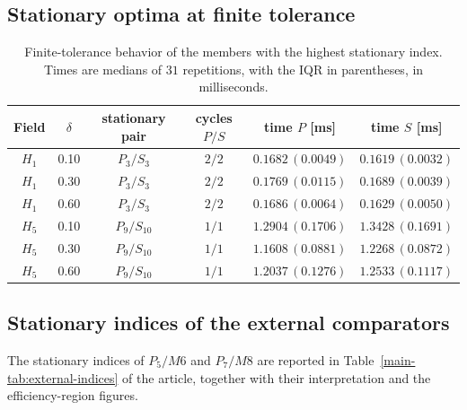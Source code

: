 \documentclass[11pt]{article}
\begin{document}
\subsection{Stationary optima at finite tolerance}
\begin{table}[htbp]
\centering
\scriptsize
\caption{Finite-tolerance behavior of the members with the highest stationary index. Times are medians of $31$ repetitions, with the IQR in parentheses, in milliseconds.}
\label{tab:asymptotic-members-finite}
\begin{tabular}{cccccc}
\toprule
Field & $\delta$ & stationary pair & cycles $P/S$ & time $P$ [ms] & time $S$ [ms]\\
\midrule
$H_1$ & 0.10 & $P_3/S_3$     & $2/2$ & $0.1682\,(0.0049)$ & $0.1619\,(0.0032)$\\
$H_1$ & 0.30 & $P_3/S_3$     & $2/2$ & $0.1769\,(0.0115)$ & $0.1689\,(0.0039)$\\
$H_1$ & 0.60 & $P_3/S_3$     & $2/2$ & $0.1686\,(0.0064)$ & $0.1629\,(0.0050)$\\
$H_5$ & 0.10 & $P_9/S_{10}$ & $1/1$ & $1.2904\,(0.1706)$ & $1.3428\,(0.1691)$\\
$H_5$ & 0.30 & $P_9/S_{10}$ & $1/1$ & $1.1608\,(0.0881)$ & $1.2268\,(0.0872)$\\
$H_5$ & 0.60 & $P_9/S_{10}$ & $1/1$ & $1.2037\,(0.1276)$ & $1.2533\,(0.1117)$\\
\bottomrule
\end{tabular}
\end{table}
\FloatBarrier

\subsection{Stationary indices of the external comparators}
The stationary indices of $P_5/M6$ and $P_7/M8$ are reported in Table~\ref{main-tab:external-indices} of the article, together with their interpretation and the efficiency-region figures.
\end{document}
